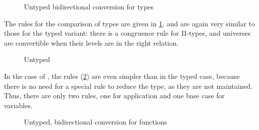 \begin{figure}[h]
  \ContinuedFloat
  \caption{Untyped bidirectional conversion for types}
  \label{fig:bd-cong-univ}
\end{figure}

The rules for the comparison of types are given in \cref{fig:bd-cong-univ}, and are again
very similar to those for the typed variant: there is a congruence rule for Π-types,
and universes are convertible when their levels are in the right relation.

\begin{figure}[h]
  \ContinuedFloat
  \caption{Untyped }
  \label{fig:neu-ucomp}
\end{figure}

In the case of , the rules (\cref{fig:neu-ucomp}) are even simpler
than in the typed case, because there is no need for a special rule to reduce the type,
as they are not maintained. Thus, there are only two rules, one for application and one
base case for variables.

\begin{figure}[h]
  \ContinuedFloat
  \caption{Untyped, bidirectional conversion for functions}
  \label{fig:bd-uconv-fun}
\end{figure}

